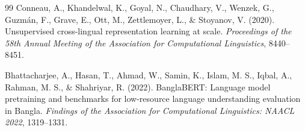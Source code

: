 \documentclass[11pt]{article}
\begin{document}
\begin{thebibliography}{99}
 Conneau, A., Khandelwal, K., Goyal, N., Chaudhary, V., Wenzek, G., Guzmán, F., Grave, E., Ott, M., Zettlemoyer, L., \& Stoyanov, V. (2020). Unsupervised cross-lingual representation learning at scale. \textit{Proceedings of the 58th Annual Meeting of the Association for Computational Linguistics}, 8440--8451.

 Bhattacharjee, A., Hasan, T., Ahmad, W., Samin, K., Islam, M. S., Iqbal, A., Rahman, M. S., \& Shahriyar, R. (2022). BanglaBERT: Language model pretraining and benchmarks for low-resource language understanding evaluation in Bangla. \textit{Findings of the Association for Computational Linguistics: NAACL 2022}, 1319--1331.

\end{thebibliography}
\end{document}
